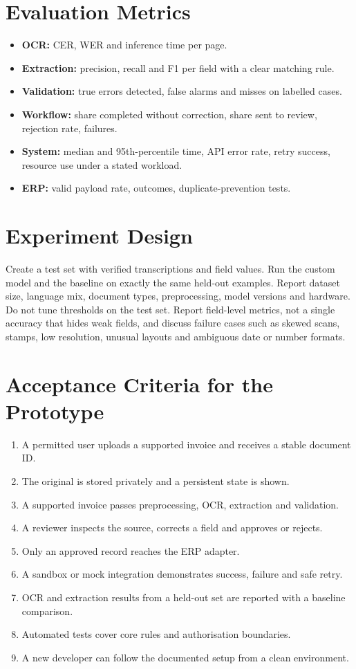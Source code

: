 \documentclass[11pt,a4paper]{report}
\begin{document}
\section{Evaluation Metrics}
\begin{itemize}
\item \textbf{OCR:} CER, WER and inference time per page.
\item \textbf{Extraction:} precision, recall and F1 per field with a clear matching rule.
\item \textbf{Validation:} true errors detected, false alarms and misses on labelled cases.
\item \textbf{Workflow:} share completed without correction, share sent to review, rejection rate, failures.
\item \textbf{System:} median and 95th-percentile time, API error rate, retry success, resource use under a stated workload.
\item \textbf{ERP:} valid payload rate, outcomes, duplicate-prevention tests.
\end{itemize}

\section{Experiment Design}
Create a test set with verified transcriptions and field values. Run the custom model and the baseline on exactly the same held-out examples. Report dataset size, language mix, document types, preprocessing, model versions and hardware. Do not tune thresholds on the test set. Report field-level metrics, not a single accuracy that hides weak fields, and discuss failure cases such as skewed scans, stamps, low resolution, unusual layouts and ambiguous date or number formats.

\section{Acceptance Criteria for the Prototype}
\begin{enumerate}
\item A permitted user uploads a supported invoice and receives a stable document ID.
\item The original is stored privately and a persistent state is shown.
\item A supported invoice passes preprocessing, OCR, extraction and validation.
\item A reviewer inspects the source, corrects a field and approves or rejects.
\item Only an approved record reaches the ERP adapter.
\item A sandbox or mock integration demonstrates success, failure and safe retry.
\item OCR and extraction results from a held-out set are reported with a baseline comparison.
\item Automated tests cover core rules and authorisation boundaries.
\item A new developer can follow the documented setup from a clean environment.
\end{enumerate}
\end{document}
